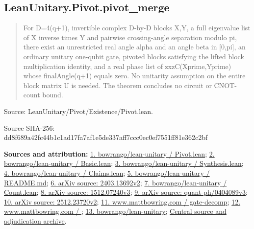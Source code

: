 \documentclass[11pt,a4paper]{article}
\begin{document}
\begin{samepage}
\subsection{LeanUnitary.Pivot.pivot\_merge}
\begin{quote}\small\ttfamily For D=4(q+1), invertible complex D-by-D blocks X,Y, a full eigenvalue list of X inverse times Y and pairwise crossing-angle separation modulo pi, there exist an unrestricted real angle alpha and an angle beta in [0,pi], an ordinary unitary one-qubit gate, pivoted blocks satisfying the lifted block multiplication identity, and a real phase list of zxzC(Xprime,Yprime) whose finalAngle(q+1) equals zero. No unitarity assumption on the entire block matrix U is needed. The theorem concludes no circuit or CNOT-count bound.\end{quote}
{\small Source: LeanUnitary/Pivot/Existence/Pivot.lean.\par}

{\small Source SHA-256: dd8f689a42fc44b1c1ad17fa7af1e5de337aff7ccc0ec0ef7551ff81e362c2bf\par}

{\small\textbf{Sources and attribution:} \href{https://github.com/bowrango/lean-unitary/blob/7014b63ee2cfd01c641a7f539c73b664a2aa3d66/LeanUnitary/Pivot/Existence/Pivot.lean}{1. bowrango/lean-unitary / Pivot.lean}; \href{https://github.com/bowrango/lean-unitary/blob/7014b63ee2cfd01c641a7f539c73b664a2aa3d66/LeanUnitary/Pivot/Multiplexor/Basic.lean}{2. bowrango/lean-unitary / Basic.lean}; \href{https://github.com/bowrango/lean-unitary/blob/7014b63ee2cfd01c641a7f539c73b664a2aa3d66/LeanUnitary/Pivot/Synthesis.lean}{3. bowrango/lean-unitary / Synthesis.lean}; \href{https://github.com/bowrango/lean-unitary/blob/7014b63ee2cfd01c641a7f539c73b664a2aa3d66/LeanUnitary/Claims.lean}{4. bowrango/lean-unitary / Claims.lean}; \href{https://github.com/bowrango/lean-unitary/blob/7014b63ee2cfd01c641a7f539c73b664a2aa3d66/LeanUnitary/README.md}{5. bowrango/lean-unitary / README.md}; \href{https://arxiv.org/abs/2403.13692v2}{6. arXiv source: 2403.13692v2}; \href{https://github.com/bowrango/lean-unitary/blob/7014b63ee2cfd01c641a7f539c73b664a2aa3d66/LeanUnitary/Pivot/Count.lean}{7. bowrango/lean-unitary / Count.lean}; \href{https://arxiv.org/abs/1512.07240v3}{8. arXiv source: 1512.07240v3}; \href{https://arxiv.org/abs/quant-ph/0404089v3}{9. arXiv source: quant-ph/0404089v3}; \href{https://arxiv.org/html/2512.23720v2}{10. arXiv source: 2512.23720v2}; \href{https://www.mattbowring.com/posts/gate-decomp/}{11. www.mattbowring.com / gate-decomp}; \href{https://www.mattbowring.com/}{12. www.mattbowring.com / }; \href{https://github.com/bowrango/lean-unitary/tree/7014b63ee2cfd01c641a7f539c73b664a2aa3d66}{13. bowrango/lean-unitary}; \href{https://github.com/alejandrozu/openmath-2026-judging}{Central source and adjudication archive}.\par}

\end{samepage}
\end{document}

